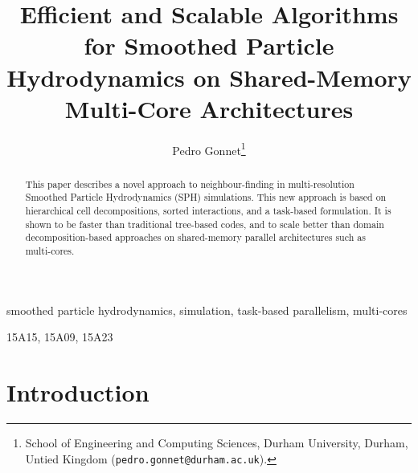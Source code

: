 \documentclass[final]{siamltex}
\date{}
\title{Efficient and Scalable Algorithms for Smoothed Particle Hydrodynamics on
    Shared-Memory Multi-Core Architectures}
\author{Pedro Gonnet\thanks{School of Engineering and Computing Sciences,
    Durham University, Durham, Untied Kingdom ({\tt pedro.gonnet@durham.ac.uk}).}}
\begin{document}
\lstset{%
    language=C,
    basicstyle=\small\tt,
    numbers=left,
    numberstyle=\tiny
    }


\maketitle


\begin{abstract}
This paper describes a novel approach to neighbour-finding in multi-resolution
Smoothed Particle Hydrodynamics (SPH) simulations.
This new approach is based on hierarchical cell decompositions, sorted interactions,
and a task-based formulation.
It is shown to be faster than traditional tree-based
codes, and to scale better than domain decomposition-based approaches on
shared-memory parallel architectures such as multi-cores.
\end{abstract}


\begin{keywords} 
smoothed particle hydrodynamics,
simulation,
task-based parallelism,
multi-cores
\end{keywords}

\begin{AMS}
15A15, 15A09, 15A23
\end{AMS}

\pagestyle{myheadings}
\thispagestyle{plain}


\section{Introduction}
\end{document}
